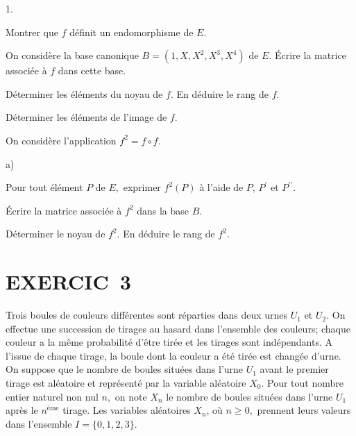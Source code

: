 \documentclass[11pt]{article}%
\begin{document}
\begin{noliste}{1.}
 \setlength{\itemsep}{4mm}
\item Montrer que $f$ définit un endomorphisme de $E.$

\item On considère la base canonique $B = (1,X,X^{2},X^{3},X^{4})$ de
$E.$
Écrire la matrice associée à $f$ dans cette base.

\item Déterminer les éléments du noyau de $f.$ En déduire le rang de
$f.$

\item Déterminer les éléments de l'image de $f.$

\item On considère l'application $f^{2} = f\circ f.$

\begin{noliste}{a)}
 \setlength{\itemsep}{2mm}
\item Pour tout élément $P$ de $E,$ exprimer $f^{2}(P)$ à l'aide de
$P$, $P^{\prime }$ et $P^{\prime \prime }.$

\item Écrire la matrice associée à $f^{2}$ dans la base $B.$

\item Déterminer le noyau de $f^{2}.$ En déduire le rang de $f^{2}.$
\end{noliste}
\end{noliste}

\section*{EXERCIC\E\ 3}

Trois boules de couleurs différentes sont réparties dans deux urnes
$U_{1}$
et $U_{2}.$ On effectue une succession de tirages au hasard dans
l'ensemble
des couleurs; chaque couleur a la même probabilité d'être tirée et les
tirages sont indépendants. A l'issue de chaque tirage, la boule dont la
couleur a été tirée est changée d'urne.\\
On suppose que le nombre de boules situées dans l'urne $U_{1}$ avant le
premier tirage est aléatoire et représenté par la variable aléatoire
$X_{0}.$
Pour tout nombre entier naturel non nul $n,$ on note $X_{n}$ le nombre
de
boules situées dans l'urne $U_{1}$ après le $n^{\text{ème}}$ tirage.
Les
variables aléatoires $X_{n}$, où $n\geq 0,$ prennent leurs valeurs dans
l'ensemble $I = \{0,1,2,3\}.$
\end{document}
